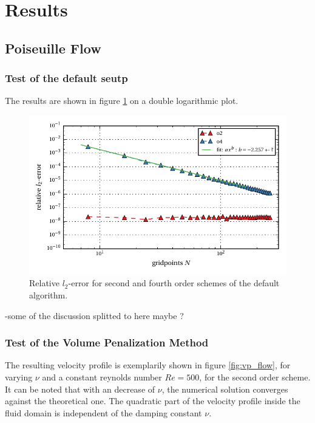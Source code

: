 \clearpage

\section{Results}
\subsection{Poiseuille Flow}
\subsubsection{Test of the default seutp}
The results are shown in figure \ref{fig:ema1} on a double logarithmic plot.

\begin{figure}[!bp]
    \centering
    \includegraphics{gfx/immersed_boundary/poiseuille_flow/1_default/relative_l2error.pdf}
    \caption{Relative $l_2$-error for second and fourth order schemes of the default algorithm.\label{fig:ema1}}
\end{figure}

-some of the discussion splitted to here maybe ?

\subsubsection{Test of the Volume Penalization Method}

The resulting velocity profile is exemplarily shown in figure \ref{fig:vp_flow}, for varying $\nu$ and a constant reynolds number $Re=500$, for the second order scheme.\\
It can be noted that with an decrease of $\nu$, the numerical solution converges against the theoretical one.
The quadratic part of the velocity profile inside the fluid domain is independent of the damping constant $\nu$.

